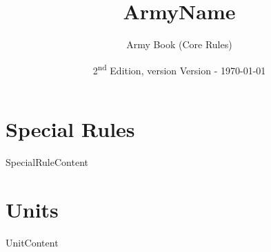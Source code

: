 \documentclass[12pt]{article}
\begin{document}
\title{ {{ArmyName}} }
\author{Army Book (Core Rules)}
\date{2\textsuperscript{nd} Edition, version \the\year{} {{Version}} - \today}
\maketitle
\tableofcontents

\section*{Special Rules}
{{SpecialRuleContent}}

\section*{Units}
{{UnitContent}}
\end{document}
